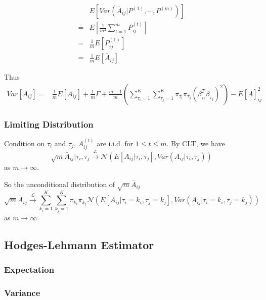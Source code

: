 \documentclass[a4paper]{article}
\begin{document}
\begin{align*}
    & E \left[ Var \left( \bar{A}_{ij} | P^{(1)}, \cdots, P^{(m)} \right) \right] \\
    = & E \left[ \frac{1}{m^2} \sum_{t=1}^m P_{ij}^{(t)} \right] \\
    = & \frac{1}{m} E \left[ P_{ij}^{(1)} \right] \\
    = & \frac{1}{m} E \left[ \bar{A}_{ij} \right]
\end{align*}

Thus
\begin{align*}
	Var \left[ \bar{A}_{ij} \right] = & \frac{1}{m} E \left[ \bar{A}_{ij} \right] + 
    \frac{1}{m} \Gamma + \frac{m-1}{m} \left( \sum_{\tau_i = 1}^K \sum_{\tau_j = 1}^K \pi_{\tau_i} \pi_{\tau_j} \left( \beta_{\tau_i}^T \beta_{\tau_j} \right)^2 \right) - E[\bar{A}]_{ij}^2
\end{align*}

\subsubsection{Limiting Distribution}
Condition on $\tau_i$ and $\tau_j$, $A_{ij}^{(t)}$ are i.i.d. for $1 \le t \le m$. By CLT, we have
\[
	\sqrt{m} \bar{A}_{ij} | \tau_i, \tau_j \stackrel{\mathcal{L}}{\rightarrow} \mathcal{N} \left( E \left[ A_{ij} | \tau_i, \tau_j\right], Var \left( A_{ij} | \tau_i, \tau_j\right) \right)
\]
as $m \rightarrow \infty$.

So the unconditional distribution of $\sqrt{m} \bar{A}_{ij}$
\[
	\sqrt{m} \bar{A}_{ij} \stackrel{\mathcal{L}}{\rightarrow} \sum_{k_i = 1}^K \sum_{k_j = 1}^K \pi_{k_i} \pi_{k_j} \mathcal{N} \left( E \left[ A_{ij} | \tau_i=k_i, \tau_j=k_j\right], Var \left( A_{ij} | \tau_i=k_i, \tau_j=k_j\right) \right)
\]
as $m \rightarrow \infty$.







\subsection{Hodges-Lehmann Estimator}

\subsubsection{Expectation}




\subsubsection{Variance}
\end{document}
